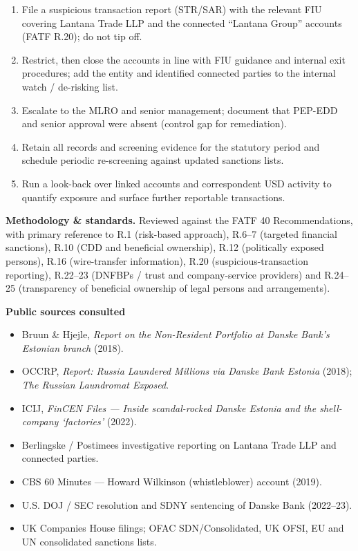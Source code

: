 \documentclass[10.5pt]{article}
\begin{document}
\begin{enumerate}
\item File a suspicious transaction report (STR/SAR) with the relevant FIU covering Lantana Trade LLP and the connected ``Lantana Group'' accounts (FATF R.20); do not tip off.
\item Restrict, then close the accounts in line with FIU guidance and internal exit procedures; add the entity and identified connected parties to the internal watch / de-risking list.
\item Escalate to the MLRO and senior management; document that PEP-EDD and senior approval were absent (control gap for remediation).
\item Retain all records and screening evidence for the statutory period and schedule periodic re-screening against updated sanctions lists.
\item Run a look-back over linked accounts and correspondent USD activity to quantify exposure and surface further reportable transactions.
\end{enumerate}

{\footnotesize
\textbf{Methodology \& standards.} Reviewed against the FATF 40 Recommendations, with primary reference to R.1 (risk-based approach), R.6--7 (targeted financial sanctions), R.10 (CDD and beneficial ownership), R.12 (politically exposed persons), R.16 (wire-transfer information), R.20 (suspicious-transaction reporting), R.22--23 (DNFBPs / trust and company-service providers) and R.24--25 (transparency of beneficial ownership of legal persons and arrangements).
}

\vspace{4pt}
{\footnotesize
\textbf{Public sources consulted}
\begin{itemize}
\item Bruun \& Hjejle, \textit{Report on the Non-Resident Portfolio at Danske Bank's Estonian branch} (2018).
\item OCCRP, \textit{Report: Russia Laundered Millions via Danske Bank Estonia} (2018); \textit{The Russian Laundromat Exposed}.
\item ICIJ, \textit{FinCEN Files --- Inside scandal-rocked Danske Estonia and the shell-company `factories'} (2022).
\item Berlingske / Postimees investigative reporting on Lantana Trade LLP and connected parties.
\item CBS 60 Minutes --- Howard Wilkinson (whistleblower) account (2019).
\item U.S. DOJ / SEC resolution and SDNY sentencing of Danske Bank (2022--23).
\item UK Companies House filings; OFAC SDN/Consolidated, UK OFSI, EU and UN consolidated sanctions lists.
\end{itemize}
}
\end{document}
